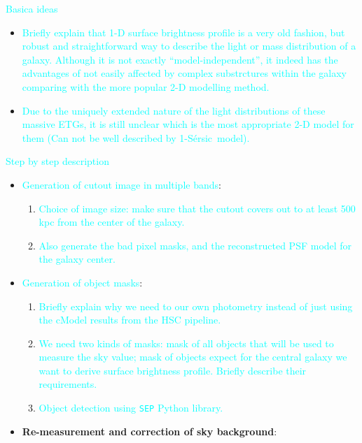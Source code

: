 \documentclass[preprint]{aastex}
\def\ser{{S\'{e}rsic\ }}
\newcommand{\plan}[1]{\textcolor{cyan}{#1}}
\begin{document}
\begin{CJK*}{UTF8}{gbsn}
    \plan{Basica ideas}
    \begin{itemize}
        \item \plan{Briefly explain that 1-D surface brightness profile is a very old 
            fashion, but robust and straightforward way to describe the light or mass 
            distribution of a galaxy.  Although it is not exactly ``model-independent'', 
            it indeed has the advantages of not easily affected by complex substrctures 
            within the galaxy comparing with the more popular 2-D modelling method. }
        \item \plan{Due to the uniquely extended nature of the light distributions of 
            these massive ETGs, it is still unclear which is the most appropriate 2-D 
            model for them (Can not be well described by 1-\ser model). }
    \end{itemize}
    
    \plan{Step by step description}
    \begin{itemize}
        \item \plan{Generation of cutout image in multiple bands}: \\
            \begin{enumerate}
                \item \plan{Choice of image size: make sure that the cutout covers out 
                    to at least 500 kpc from the center of the galaxy.}
                \item \plan{Also generate the bad pixel masks, and the reconstructed 
                    PSF model for the galaxy center.}
            \end{enumerate}
        \item \plan{Generation of object masks}: \\
            \begin{enumerate}
                \item \plan{Briefly explain why we need to our own photometry instead 
                    of just using the cModel results from the HSC pipeline.}
                \item \plan{We need two kinds of masks: mask of all objects that will 
                    be used to measure the sky value; mask of objects expect for the 
                    central galaxy we want to derive surface brightness profile.  
                    Briefly describe their requirements.}
                \item \plan{Object detection using \texttt{SEP} Python library.}
            \end{enumerate}
        \item \textbf{Re-measurement and correction of sky background}:
    \end{itemize}
    

\end{CJK*}
\end{document}
